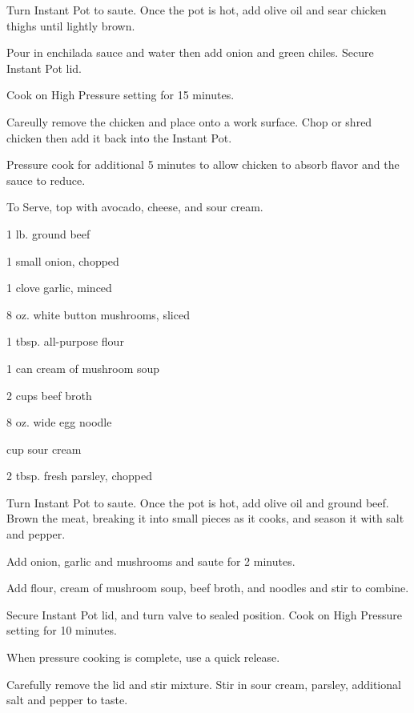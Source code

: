 \documentclass{cookbook}
\begin{document}
Turn Instant Pot to saute. Once the pot is hot, add olive oil and sear chicken thighs until lightly brown.

Pour in enchilada sauce and water then add onion and green chiles. Secure Instant Pot lid.

Cook on High Pressure setting for 15 minutes.

Careully remove the chicken and place onto a work surface. Chop or shred chicken then add it back into the Instant Pot.

Pressure cook for additional 5 minutes to allow chicken to absorb flavor and the sauce to reduce.

To Serve, top with avocado, cheese, and sour cream.


\begin{ingredients}
    \item 1 lb. ground beef
    \item 1 small onion, chopped
    \item 1 clove garlic, minced
    \item 8 oz. white button mushrooms, sliced
    \item 1 tbsp. all-purpose flour
    \item 1 can cream of mushroom soup
    \item 2  cups beef broth
    \item 8 oz. wide egg noodle
    \item {} cup sour cream
    \item 2 tbsp. fresh parsley, chopped
\end{ingredients}

Turn Instant Pot to saute. Once the pot is hot, add olive oil and ground beef. Brown the meat, breaking it into small pieces as it cooks, and season it with salt and pepper.

Add onion, garlic and mushrooms and saute for 2 minutes.

Add flour, cream of mushroom soup, beef broth, and noodles and stir to combine.

Secure Instant Pot lid, and turn valve to sealed position. Cook on High Pressure setting for 10 minutes.

When pressure cooking is complete, use a quick release.

Carefully remove the lid and stir mixture. Stir in sour cream, parsley, additional salt and pepper to taste.

\end{document}
